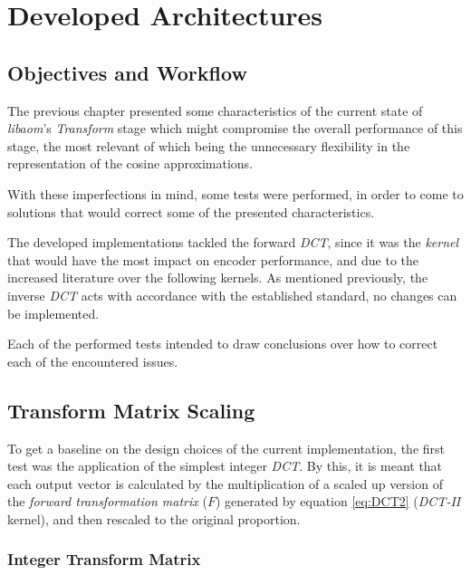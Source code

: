 \cleardoublepage
\chapter{Developed Architectures}

\section{Objectives and Workflow}

The previous chapter presented some characteristics of the current state of \emph{libaom}'s \emph{Transform} stage which might compromise the overall performance of this stage, the most relevant of which being the unnecessary flexibility in the representation of the cosine approximations.

With these imperfections in mind, some tests were performed, in order to come to solutions that would correct some of the presented characteristics.

The developed implementations tackled the forward \emph{DCT}, since it was the \emph{kernel} that would have the most impact on encoder performance, and due to the increased literature over the following kernels. As mentioned previously, the inverse \emph{DCT} acts with accordance with the established standard, no changes can be implemented.

Each of the performed tests intended to draw conclusions over how to correct each of the encountered issues.

\section{Transform Matrix Scaling}

To get a baseline on the design choices of the current implementation, the first test was the application of the simplest integer \emph{DCT}. By this, it is meant that each output vector is calculated by the multiplication of a scaled up version of the \emph{forward transformation matrix} ($F$) generated by equation \ref{eq:DCT2} (\emph{DCT-II} kernel), and then rescaled to the original proportion.

\subsection{Integer Transform Matrix} \label{ssec:hvs}

